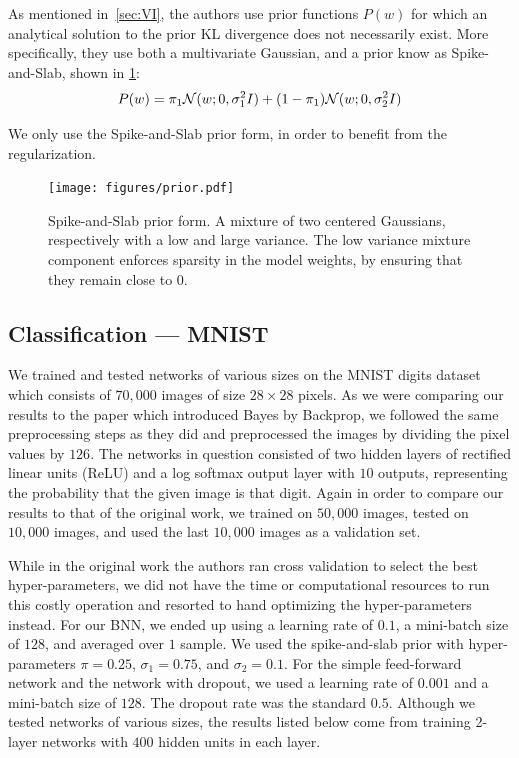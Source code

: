 \documentclass[11pt]{article}
\begin{document}
As mentioned in~\cref{sec:VI}, the authors use prior functions $P(w)$ for which
an analytical solution to the prior KL divergence does not necessarily exist.
More specifically, they use both a multivariate Gaussian, and a prior know as
Spike-and-Slab, shown in \cref{fig:spike_and_slab}:
%
\begin{equation}
  P(w) = \pi_1 \mathcal{N}(w; 0, \sigma_1^2 I) + (1-\pi_1) \mathcal{N}(w; 0,
  \sigma_2^2 I) \\
\end{equation}

We only use the Spike-and-Slab prior form, in order to benefit from the
regularization.

\begin{figure}
  \centering
  \texttt{[image: figures/prior.pdf]}
  \caption{Spike-and-Slab prior form.  A mixture of two centered Gaussians,
  respectively with a low and large variance.  The low variance mixture
  component enforces sparsity in the model weights, by ensuring that they
  remain close to $0$.}\label{fig:spike_and_slab}
\end{figure}
 

\subsection{Classification --- MNIST}

We trained and tested networks of various sizes on the MNIST digits
dataset~\cite{mnist} which consists of $70,000$ images of size $28\times28$
pixels.  As we were comparing our results to the paper which introduced Bayes
by Backprop, we followed the same preprocessing steps as they did and
preprocessed the images by dividing the pixel values by $126$.  The networks
in question consisted of two hidden layers of rectified linear units (ReLU) and
a log softmax output layer with $10$ outputs, representing the probability that
the given image is that digit. Again in order to compare our results to that of
the original work, we trained on $50,000$ images, tested on $10,000$ images,
and used the last $10,000$ images as a validation set.

While in the original work the authors ran cross validation to select the best
hyper-parameters, we did not have the time or computational resources to run
this costly operation and resorted to hand optimizing the hyper-parameters
instead.  For our BNN, we ended up using a learning rate of $0.1$, a mini-batch
size of $128$, and averaged over $1$ sample. We used the spike-and-slab prior
with hyper-parameters $\pi = 0.25$, $\sigma_1 = 0.75$, and $\sigma_2 = 0.1$. For
the simple feed-forward network and the network with dropout, we used a learning
rate of $0.001$ and a mini-batch size of $128$.  The dropout rate was the
standard $0.5$. Although we tested networks of various sizes, the results
listed below come from training 2-layer networks with $400$ hidden units in
each layer.
\end{document}
